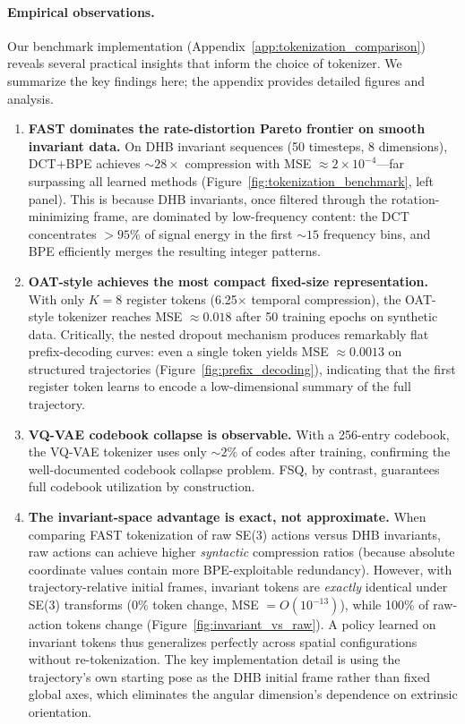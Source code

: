\documentclass[11pt]{article}
\begin{document}
\paragraph{Empirical observations.}
Our benchmark implementation (Appendix~\ref{app:tokenization_comparison}) reveals several practical insights that inform the choice of tokenizer. We summarize the key findings here; the appendix provides detailed figures and analysis.
\begin{enumerate}
  \item \textbf{FAST dominates the rate-distortion Pareto frontier on smooth invariant data.} On DHB invariant sequences (50 timesteps, 8 dimensions), DCT+BPE achieves ${\sim}28\times$ compression with MSE $\approx 2\times10^{-4}$---far surpassing all learned methods (Figure~\ref{fig:tokenization_benchmark}, left panel). This is because DHB invariants, once filtered through the rotation-minimizing frame, are dominated by low-frequency content: the DCT concentrates $>95\%$ of signal energy in the first ${\sim}15$ frequency bins, and BPE efficiently merges the resulting integer patterns.
  \item \textbf{OAT-style achieves the most compact fixed-size representation.} With only $K=8$ register tokens (6.25$\times$ temporal compression), the OAT-style tokenizer reaches MSE $\approx 0.018$ after 50 training epochs on synthetic data. Critically, the nested dropout mechanism produces remarkably flat prefix-decoding curves: even a single token yields MSE $\approx 0.0013$ on structured trajectories (Figure~\ref{fig:prefix_decoding}), indicating that the first register token learns to encode a low-dimensional summary of the full trajectory.
  \item \textbf{VQ-VAE codebook collapse is observable.} With a 256-entry codebook, the VQ-VAE tokenizer uses only ${\sim}2\%$ of codes after training, confirming the well-documented codebook collapse problem. FSQ, by contrast, guarantees full codebook utilization by construction.
  \item \textbf{The invariant-space advantage is exact, not approximate.} When comparing FAST tokenization of raw SE(3) actions versus DHB invariants, raw actions can achieve higher \emph{syntactic} compression ratios (because absolute coordinate values contain more BPE-exploitable redundancy). However, with trajectory-relative initial frames, invariant tokens are \emph{exactly} identical under SE(3) transforms (0\% token change, MSE $= O(10^{-13})$), while 100\% of raw-action tokens change (Figure~\ref{fig:invariant_vs_raw}). A policy learned on invariant tokens thus generalizes perfectly across spatial configurations without re-tokenization. The key implementation detail is using the trajectory's own starting pose as the DHB initial frame rather than fixed global axes, which eliminates the angular dimension's dependence on extrinsic orientation.
\end{enumerate}
\end{document}
